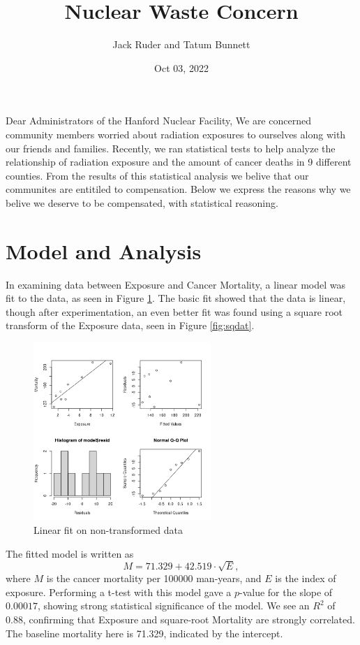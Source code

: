 \documentclass[]{article}
\title{Nuclear Waste Concern}
\date{Oct 03, 2022}
\author{Jack Ruder and Tatum Bunnett}
\begin{document}
\doublespacing
\maketitle

Dear Administrators of the Hanford Nuclear Facility, 
We are concerned community members worried about radiation exposures to ourselves along with our friends and families. 
Recently, we ran statistical tests to help analyze the relationship of radiation exposure and the amount of cancer deaths in 9 different counties. 
From the results of this statistical analysis we belive that our communites are entitiled to compensation. 
Below we express the reasons why we belive we deserve to be compensated, with statistical reasoning.
\section{Model and Analysis}
In examining data between Exposure and Cancer Mortality, a linear model was fit to the  data, as seen in Figure \ref{fig:ogdat}. The basic fit showed that the data is linear, though after experimentation, an even better fit was found using a square root transform of the Exposure data, seen in Figure \ref{fig:sqdat}. 
\begin{figure}[htpb]
	\centering
	\includegraphics[width=0.6\textwidth]{"../originalData.png"}
	\caption{Linear fit on non-transformed data}
	\label{fig:ogdat}
\end{figure}
The fitted model is written as \begin{equation}M = 71.329 + 42.519 \cdot \sqrt{E}, \end{equation}
where \(M\) is the cancer mortality per 100000 man-years, and \(E\) is the index of exposure. Performing a t-test with this model gave a \(p\)-value for the slope of \(0.00017\), showing strong statistical significance of the model. We see an \(R^2\) of 0.88, confirming that Exposure and square-root Mortality are strongly correlated.  The baseline mortality here is 71.329, indicated by the intercept.
\end{document}

